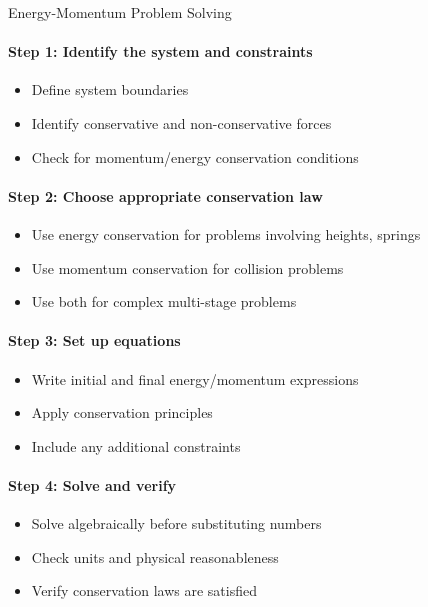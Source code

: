 \begin{KR}{Energy-Momentum Problem Solving}\\
    \paragraph{Step 1: Identify the system and constraints}
    \begin{itemize}
        \item Define system boundaries
        \item Identify conservative and non-conservative forces
        \item Check for momentum/energy conservation conditions
    \end{itemize}
    
    \paragraph{Step 2: Choose appropriate conservation law}
    \begin{itemize}
        \item Use energy conservation for problems involving heights, springs
        \item Use momentum conservation for collision problems
        \item Use both for complex multi-stage problems
    \end{itemize}
    
    \paragraph{Step 3: Set up equations}
    \begin{itemize}
        \item Write initial and final energy/momentum expressions
        \item Apply conservation principles
        \item Include any additional constraints
    \end{itemize}
    
    \paragraph{Step 4: Solve and verify}
    \begin{itemize}
        \item Solve algebraically before substituting numbers
        \item Check units and physical reasonableness
        \item Verify conservation laws are satisfied
    \end{itemize}
\end{KR}

